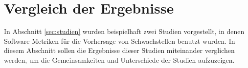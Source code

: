 \section{Vergleich der Ergebnisse}
\label{sec:vergleich}
In Abschnitt \ref{sec:studien} wurden beispielhaft zwei Studien vorgestellt, in denen Software-Metriken für die Vorhersage von Schwachstellen benutzt wurden.
In diesem Abschnitt sollen die Ergebnisse dieser Studien miteinander verglichen werden, um die Gemeinsamkeiten und Unterschiede der Studien aufzuzeigen.
